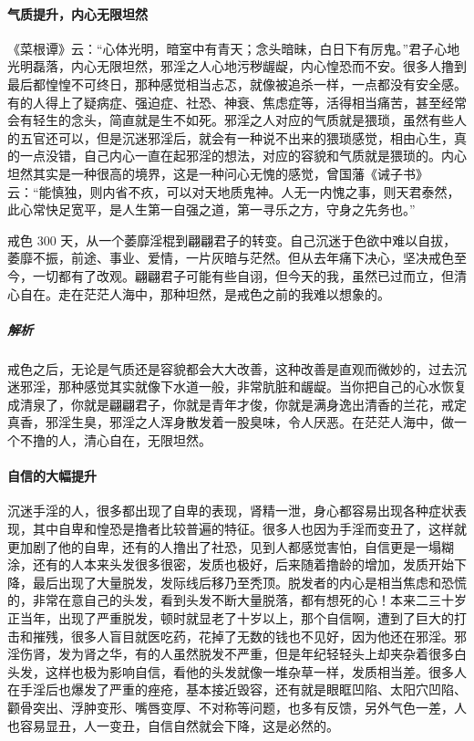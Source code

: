 \paragraph{气质提升，内心无限坦然}

《菜根谭》云：“心体光明，暗室中有青天；念头暗昧，白日下有厉鬼。”君子心地光明磊落，内心无限坦然，邪淫之人心地污秽龌龊，内心惶恐而不安。很多人撸到最后都惶惶不可终日，那种感觉相当忐忑，就像被追杀一样，一点都没有安全感。有的人得上了疑病症、强迫症、社恐、神衰、焦虑症等，活得相当痛苦，甚至经常会有轻生的念头，简直就是生不如死。邪淫之人对应的气质就是猥琐，虽然有些人的五官还可以，但是沉迷邪淫后，就会有一种说不出来的猥琐感觉，相由心生，真的一点没错，自己内心一直在起邪淫的想法，对应的容貌和气质就是猥琐的。内心坦然其实是一种很高的境界，这是一种问心无愧的感觉，曾国藩《诫子书》云：“能慎独，则内省不疚，可以对天地质鬼神。人无一内愧之事，则天君泰然，此心常快足宽平，是人生第一自强之道，第一寻乐之方，守身之先务也。”

\begin{case}
    戒色 300 天，从一个萎靡淫棍到翩翩君子的转变。自己沉迷于色欲中难以自拔，萎靡不振，前途、事业、爱情，一片灰暗与茫然。但从去年痛下决心，坚决戒色至今，一切都有了改观。翩翩君子可能有些自诩，但今天的我，虽然已过而立，但清心自在。走在茫茫人海中，那种坦然，是戒色之前的我难以想象的。
    \subparagraph{解析} 戒色之后，无论是气质还是容貌都会大大改善，这种改善是直观而微妙的，过去沉迷邪淫，那种感觉其实就像下水道一般，非常肮脏和龌龊。当你把自己的心水恢复成清泉了，你就是翩翩君子，你就是青年才俊，你就是满身逸出清香的兰花，戒定真香，邪淫生臭，邪淫之人浑身散发着一股臭味，令人厌恶。在茫茫人海中，做一个不撸的人，清心自在，无限坦然。
\end{case}

\paragraph{自信的大幅提升}

沉迷手淫的人，很多都出现了自卑的表现，肾精一泄，身心都容易出现各种症状表现，其中自卑和惶恐是撸者比较普遍的特征。很多人也因为手淫而变丑了，这样就更加剧了他的自卑，还有的人撸出了社恐，见到人都感觉害怕，自信更是一塌糊涂，还有的人本来头发很多很密，发质也极好，后来随着撸龄的增加，发质开始下降，最后出现了大量脱发，发际线后移乃至秃顶。脱发者的内心是相当焦虑和恐慌的，非常在意自己的头发，看到头发不断大量脱落，都有想死的心！本来二三十岁正当年，出现了严重脱发，顿时就显老了十岁以上，那个自信啊，遭到了巨大的打击和摧残，很多人盲目就医吃药，花掉了无数的钱也不见好，因为他还在邪淫。邪淫伤肾，发为肾之华，有的人虽然脱发不严重，但是年纪轻轻头上却夹杂着很多白头发，这样也极为影响自信，看他的头发就像一堆杂草一样，发质相当差。很多人在手淫后也爆发了严重的痤疮，基本接近毁容，还有就是眼眶凹陷、太阳穴凹陷、颧骨突出、浮肿变形、嘴唇变厚、不对称等问题，也多有反馈，另外气色一差，人也容易显丑，人一变丑，自信自然就会下降，这是必然的。

